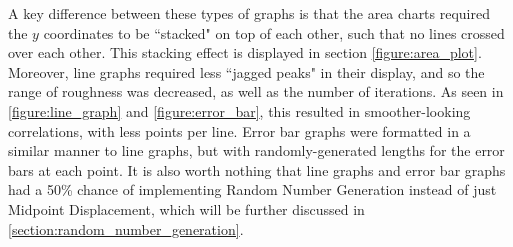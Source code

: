 \hfill

A key difference between these types of graphs is that the area charts required the \(y\) coordinates to be ``stacked" on top of each other, such that no lines crossed over each other. This stacking effect is displayed in section \autoref{figure:area_plot}. Moreover, line graphs required less ``jagged peaks" in their display, and so the range of roughness was decreased, as well as the number of iterations. As seen in \autoref{figure:line_graph} and \autoref{figure:error_bar}, this resulted in smoother-looking correlations, with less points per line. Error bar graphs were formatted in a similar manner to line graphs, but with randomly-generated lengths for the error bars at each point. It is also worth nothing that line graphs and error bar graphs had a 50\% chance of implementing Random Number Generation instead of just Midpoint Displacement, which will be further discussed in \autoref{section:random_number_generation}. 

\hfill

